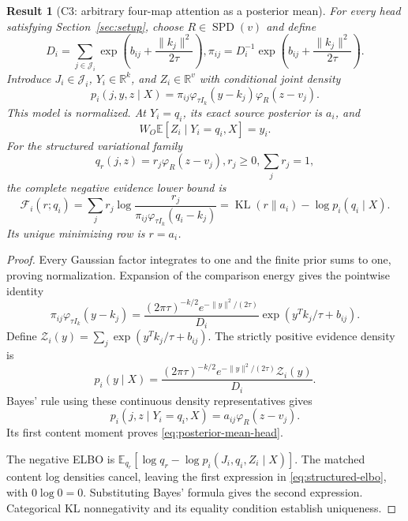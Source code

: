 \documentclass[11pt]{article}
\newtheorem{result}{Result}
\newcommand{\R}{\mathbb{R}}
\newcommand{\E}{\mathbb{E}}
\newcommand{\KL}{\operatorname{KL}}
\newcommand{\SPD}{\operatorname{SPD}}
\begin{document}
\begin{result}[C3: arbitrary four-map attention as a posterior mean]
\label{res:C3}
For every head satisfying Section~\ref{sec:setup}, choose $R\in\SPD(v)$ and define
\begin{equation}
D_i=\sum_{j\in\mathcal J_i}\exp\left(b_{ij}+\frac{\|k_j\|^2}{2\tau}\right),
\pi_{ij}=D_i^{-1}\exp\left(b_{ij}+\frac{\|k_j\|^2}{2\tau}\right).
\label{eq:compensating-prior}
\end{equation}
Introduce $J_i\in\mathcal J_i$, $Y_i\in\R^k$, and $Z_i\in\R^v$ with conditional joint density
\begin{equation}
p_i(j,y,z\mid X)=\pi_{ij}\varphi_{\tau I_k}(y-k_j)\varphi_R(z-v_j).
\label{eq:joint}
\end{equation}
This model is normalized. At $Y_i=q_i$, its exact source posterior is $a_i$, and
\begin{equation}
W_O\E[Z_i\mid Y_i=q_i,X]=y_i.
\label{eq:posterior-mean-head}
\end{equation}
For the structured variational family
\begin{equation}
q_r(j,z)=r_j\varphi_R(z-v_j), r_j\geq0,\sum_jr_j=1,
\label{eq:structured-family}
\end{equation}
the complete negative evidence lower bound is
\begin{equation}
\mathcal F_i(r;q_i)=\sum_jr_j\log\frac{r_j}{\pi_{ij}\varphi_{\tau I_k}(q_i-k_j)}
=\KL(r\|a_i)-\log p_i(q_i\mid X).
\label{eq:structured-elbo}
\end{equation}
Its unique minimizing row is $r=a_i$.
\end{result}
\begin{proof}
Every Gaussian factor integrates to one and the finite prior sums to one, proving normalization. Expansion of the comparison energy gives the pointwise identity
\begin{equation}
\pi_{ij}\varphi_{\tau I_k}(y-k_j)
=\frac{(2\pi\tau)^{-k/2}e^{-\|y\|^2/(2\tau)}}{D_i}
\exp(y^Tk_j/\tau+b_{ij}).
\label{eq:normalizer-cancellation}
\end{equation}
Define $\mathcal Z_i(y)=\sum_j\exp(y^Tk_j/\tau+b_{ij})$. The strictly positive evidence density is
\begin{equation}
p_i(y\mid X)=\frac{(2\pi\tau)^{-k/2}e^{-\|y\|^2/(2\tau)}\mathcal Z_i(y)}{D_i}.
\label{eq:query-evidence}
\end{equation}
Bayes' rule using these continuous density representatives gives
\begin{equation}
p_i(j,z\mid Y_i=q_i,X)=a_{ij}\varphi_R(z-v_j).
\label{eq:full-posterior}
\end{equation}
Its first content moment proves \eqref{eq:posterior-mean-head}.

The negative ELBO is $\E_{q_r}[\log q_r-\log p_i(J_i,q_i,Z_i\mid X)]$. The matched content log densities cancel, leaving the first expression in \eqref{eq:structured-elbo}, with $0\log0=0$. Substituting Bayes' formula gives the second expression. Categorical KL nonnegativity and its equality condition establish uniqueness.
\end{proof}
\end{document}

